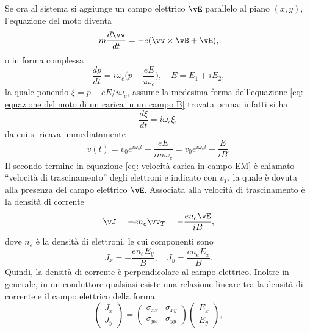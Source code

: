 Se ora al sistema si aggiunge un campo elettrico $\vE$ parallelo al piano $(x,y)$, l'equazione del moto diventa
\begin{equation}
    m\frac{d\vv}{dt} = -e(\vv \times \vB + \vE),
\end{equation}
o in forma complessa 
\begin{equation}
    \frac{dp}{dt} = i\omega_c\bigg(p - \frac{eE}{i\omega_c}\bigg),\quad E= E_1 + iE_2,
\end{equation}
la quale ponendo $\xi = p - eE/i\omega_c$, assume la medesima forma dell'equazione \eqref{eq: equazione del moto di un carica in un campo B} trovata prima; infatti si ha
\begin{equation}
    \frac{d\xi}{dt} = i\omega_c\xi,
\end{equation}
da cui si ricava immediatamente
\begin{equation}
\label{eq: velocità carica in campo EM}
    v(t) = v_0e^{i\omega_c t} + \frac{eE}{im\omega_c} = v_0e^{i\omega_c t} + \frac{E}{iB}.
\end{equation}
Il secondo termine in equazione \eqref{eq: velocità carica in campo EM} è chiamato ``velocità di trascinamento'' degli elettroni e indicato con $v_T$, la quale è dovuta alla presenza del campo elettrico $\vE$. Associata alla velocità di trascinamento è la densità di corrente
\begin{equation}
    \vJ = -en_e\vv_T = -\frac{en_e\vE}{iB},
\end{equation}
dove $n_e$ è la densità di elettroni, le cui componenti sono 
\begin{equation}
    J_x = -\frac{en_eE_y}{B},\quad J_y = \frac{en_eE_x}{B}.
\end{equation}
Quindi, la densità di corrente è perpendicolare al campo elettrico. Inoltre in generale, in un conduttore qualsiasi esiste una relazione lineare tra la densità di corrente e il campo elettrico della forma
\begin{equation}
    \begin{pmatrix}
        J_x \\
        J_y
    \end{pmatrix} = 
    \begin{pmatrix}
        \sigma_{xx} & \sigma_{xy} \\
        \sigma_{yx} & \sigma_{yy}
    \end{pmatrix}
    \begin{pmatrix}
        E_x \\
        E_y
    \end{pmatrix},
\end{equation}
